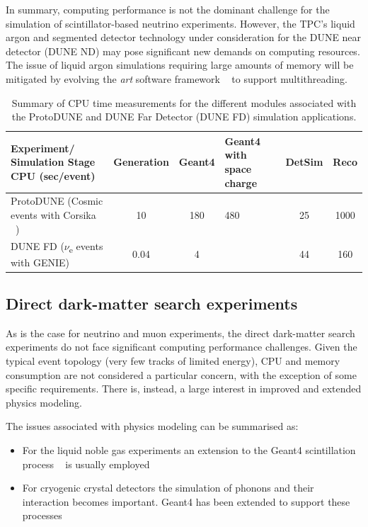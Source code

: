 \documentclass[12pt,a4paper]{article}
\begin{document}
{In summary, computing performance is not the dominant challenge for the
simulation of scintillator-based neutrino experiments. However, the
TPC's liquid argon and segmented detector technology under consideration
for the DUNE near detector (DUNE ND) may pose significant new demands on
computing resources. The issue of liquid argon simulations requiring
large amounts of memory will be mitigated by evolving the \emph{art}
software framework ~\cite{Green:2012gv} to support multithreading.

\begin{table}[tbhp]
\centering
\begin{tabular}{| p{3.5cm} | c | c | p{2.5cm} | c | c |}
\hline
Experiment/ Simulation Stage CPU (sec/event) & Generation & Geant4 
& Geant4 with space charge & DetSim & Reco \\ \hline
ProtoDUNE (Cosmic events with Corsika ~\cite{Heck:1998vt}) & 10 & 180  & 
480 & 25 & 1000 \\ \hline
DUNE FD ($\nu$\textsubscript{e} events with GENIE) & 0.04 & 4 &   & 
44 & 160 \\ \hline
\end{tabular}
\caption{Summary of CPU time measurements for the different
modules associated with the ProtoDUNE and DUNE Far Detector (DUNE FD)
simulation applications.}
\label{table:cpudune}
\end{table}

\hypertarget{direct-dark-matter-search-experiments}{%
\subsection{Direct dark-matter search
experiments}\label{direct-dark-matter-search-experiments}}

As is the case for neutrino and muon experiments, the direct dark-matter
search experiments do not face significant computing performance
challenges. Given the typical event topology (very few tracks of limited
energy), CPU and memory consumption are not considered a particular
concern, with the exception of some specific requirements. There is,
instead, a large interest in improved and extended physics modeling.

The issues associated with physics modeling can be summarised as:

\begin{itemize}
\item
  For the liquid noble gas experiments an extension to the Geant4
  scintillation process ~\cite{1748-0221-6-10-P10002} is usually employed
\item
  For cryogenic crystal detectors the simulation of phonons and their
  interaction becomes important. Geant4 has been extended to support
  these processes ~\cite{Brandt:2014imy}
\end{itemize}

}
\end{document}
